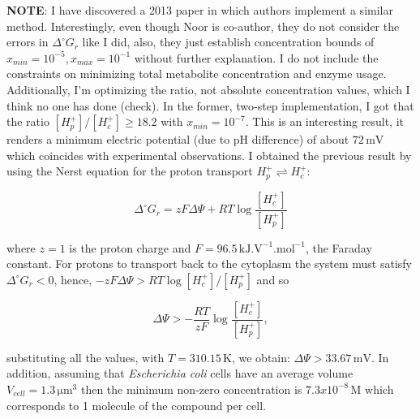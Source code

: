 \documentclass[12pt]{article}
\begin{document}
  \noindent \textbf{NOTE}: I have discovered a 2013 paper \cite{Tepper2013} in which authors implement a similar method. Interestingly, even though Noor is co-author, they do not consider the errors in $\Delta^{\circ} G_{r}$ like I did, also, they just establish concentration bounds of $x_{min} = 10^{-5}, x_{max} = 10^{-1}$ without further explanation. I do not include the constraints on minimizing total metabolite concentration and enzyme usage. Additionally, I'm optimizing the ratio, not absolute concentration values, which I think no one has done (check). In the former, two-step implementation, I got that the ratio $[H_p^+] / [H_c^+] \geq 18.2$ with $x_{min} = 10^{-7}$. This is an interesting result, it renders a minimum electric potential (due to pH difference) of about
  $72 \mathrm{\,mV}$ which coincides with experimental observations. I obtained the previous result by using the Nerst equation for the proton transport $H_p^+ \rightleftharpoons H_c^+$:

  \begin{equation}
    \label{eq:7}
    \Delta^{\circ} G_{r} = zF \Delta \Psi + RT \log{\frac{[H_c^+]}{[H_p^+]}}
  \end{equation}

  \noindent where $z = 1$ is the proton charge and $F = 96.5 \, \mathrm{kJ.V^{-1}.mol^{-1}}$, the Faraday constant. For protons to transport back to the cytoplasm the system must satisfy $\Delta^{\circ} G_{r} < 0$, hence, $-zF \Delta \Psi > RT \log{[H_c^+] / [H_p^+]}$ and so

  \begin{equation}
    \label{eq:8}
    \Delta \Psi > -\frac{RT}{zF} \log{\frac{[H_c^+]}{[H_p^+]}},
  \end{equation}

  \noindent substituting all the values, with $T = 310.15 \, \mathrm{K}$, we obtain: $\Delta \Psi > 33.67 \, \mathrm{mV}$. In addition, assuming that \emph{Escherichia coli} cells have an average volume $V_{cell} = 1.3 \mathrm{\,\mu m^3}$ then the minimum non-zero concentration is $7.3x10^{-8} \mathrm{\,M}$ which corresponds to 1 molecule of the compound per cell.
\end{document}
